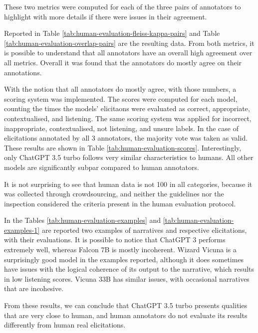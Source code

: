 
These two metrics were computed for each of the three pairs of annotators to highlight with more details if there were issues in their agreement. 


Reported in Table \ref{tab:human-evaluation-fleiss-kappa-pairs} and Table \ref{tab:human-evaluation-overlap-pairs} are the resulting data. From both metrics, it is possible to understand that all annotators have an overall high agreement over all metrics.
Overall it was found that the annotators do mostly agree on their annotations.


With the notion that all annotators do mostly agree, with those numbers, a scoring system was implemented. The scores were computed for each model, counting the times the models' elicitaons were evaluated as correct, appropriate, contextualised, and listening. The same scoring system was applied for incorrect, inappropriate, contextualised, not listening, and unsure labels. In the case of elicitations annotated by all 3 annotators, the majority vote was taken as valid. These results are shown in Table \ref{tab:human-evaluation-scores}.
Interestingly, only ChatGPT 3.5 turbo follows very similar characteristics to humans. All other models are significantly subpar compared to human annotators. 



It is not surprising to see that human data is not 100 in all categories, because it was collected through crowdsourcing, and neither the guidelines nor the inspection considered the criteria present in the human evaluation protocol. 

In the Tables \ref{tab:human-evaluation-examples} and \ref{tab:human-evaluation-examples-1} are reported two examples of narratives and respective elicitations, with their evaluations. It is possible to notice that ChatGPT 3 performs extremely well, whereas Falcon 7B is mostly incoherent. Wizard Vicuna is a surprisingly good model in the examples reported, although it does sometimes have issues with the logical coherence of its output to the narrative, which results in low listening scores. Vicuna 33B has similar issues, with occasional narratives that are incohesive. 

From these results, we can conclude that ChatGPT 3.5 turbo presents qualities that are very close to human, and human annotators do not evaluate its results differently from human real elicitations. 

